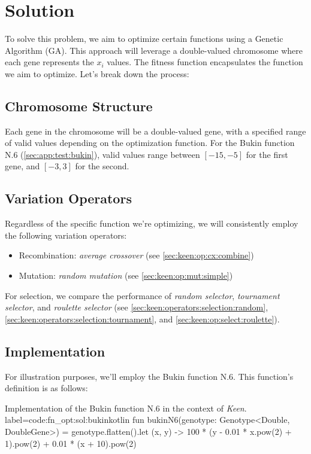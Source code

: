 \section{Solution}
\label{sec:fn_opt:sol}
  To solve this problem, we aim to optimize certain functions using a Genetic 
  Algorithm (GA). This approach will leverage a double-valued chromosome where 
  each gene represents the \(x_i\) values. The fitness function encapsulates 
  the function we aim to optimize. Let's break down the process:

  \subsection{Chromosome Structure}
    Each gene in the chromosome will be a double-valued gene, with a specified 
    range of valid values depending on the optimization function. For the Bukin 
    function N.6 (\vref{sec:app:test:bukin}), valid values range between 
    \([-15, -5]\) for the first gene, and \([-3, 3]\) for the second.

  \subsection{Variation Operators}
    Regardless of the specific function we're optimizing, we will consistently 
    employ the following variation operators:

    \begin{itemize}
      \item Recombination: \textit{average crossover} (see 
        \vref{sec:keen:op:cx:combine})
      \item Mutation: \textit{random mutation} (see 
        \vref{sec:keen:op:mut:simple})
    \end{itemize}

    For selection, we compare the performance of \textit{random selector}, 
    \textit{tournament selector}, and \textit{roulette selector} (see 
    \vref{sec:keen:operators:selection:random}, 
    \vref{sec:keen:operators:selection:tournament}, and 
    \vref{sec:keen:op:select:roulette}).

  \subsection{Implementation}
    For illustration purposes, we'll employ the Bukin function N.6. This 
    function's definition is as follows:

    \begin{code}{
      Implementation of the Bukin function N.6 in the context of \textit{Keen}.
    }{label=code:fn_opt:sol:bukin}{kotlin}
      fun bukinN6(genotype: Genotype<Double, DoubleGene>) = genotype.flatten().let { (x, y) ->
          100 * (y - 0.01 * x.pow(2) + 1).pow(2) + 0.01 * (x + 10).pow(2)
      }
    \end{code}

